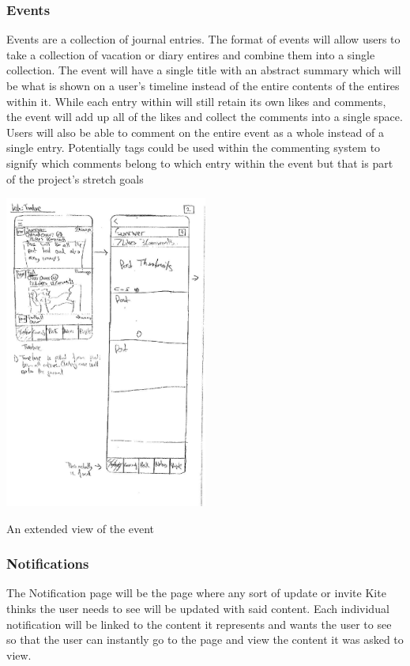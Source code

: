 \documentclass[compsoc, 10, draftclsnofoot, onecolumn]{IEEEtran}
\begin{document}
\subsubsection{Events}
Events are a collection of journal entries. The format of events will allow users to take a collection of vacation or diary entires and combine them into a single collection. The event will have a single title with an abstract summary which will be what is shown on a user's timeline instead of the entire contents of the entires within it. While each entry within will still retain its own likes and comments, the event will add up all of the likes and collect the comments into a single space. Users will also be able to comment on the entire event as a whole instead of a single entry. Potentially tags could be used within the commenting system to signify which comments belong to which entry within the event but that is part of the project's stretch goals
\begin{center}
\includegraphics[width=0.5\textwidth]{Timeline}

An extended view of the event 
\end{center}

\subsubsection{Notifications}
The Notification page will be the page where any sort of update or invite Kite thinks the user needs to see will be updated with said content. Each individual notification will be linked to the content it represents and wants the user to see so that the user can instantly go to the page and view the content it was asked to view. 
\end{document}
